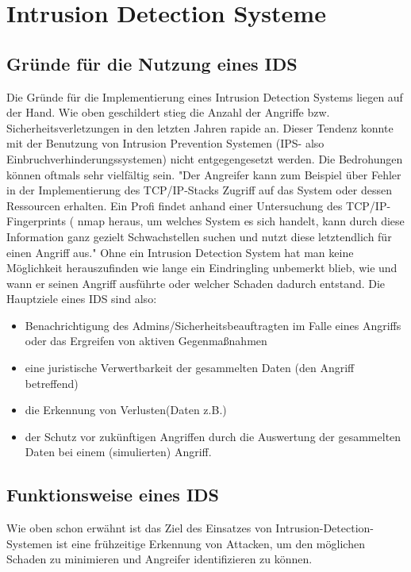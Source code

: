 \documentclass[11pt]{scrartcl}
\begin{document}
\section{Intrusion Detection Systeme}
\label{sec:IDS}

\subsection{Gründe für die Nutzung eines IDS}
\label{sec:reasons IDS}
Die Gründe für die Implementierung eines Intrusion Detection Systems liegen auf der Hand. Wie oben geschildert stieg die Anzahl der Angriffe bzw. Sicherheitsverletzungen in den letzten Jahren rapide an. Dieser Tendenz konnte mit der Benutzung von Intrusion Prevention Systemen (IPS- also Einbruchverhinderungssystemen) nicht entgegengesetzt werden. 
Die Bedrohungen können oftmals sehr vielfältig sein. "Der Angreifer kann zum Beispiel über Fehler in der Implementierung des  TCP/IP-Stacks Zugriff auf das System oder dessen Ressourcen erhalten. Ein Profi findet anhand einer Untersuchung des TCP/IP-Fingerprints ( nmap heraus, um welches System es sich handelt, kann durch diese Information ganz gezielt Schwachstellen suchen und nutzt diese letztendlich für einen Angriff aus."
Ohne ein Intrusion Detection System hat man keine Möglichkeit herauszufinden wie lange ein Eindringling unbemerkt blieb, wie und wann er seinen Angriff ausführte oder welcher Schaden dadurch entstand.
Die Hauptziele eines IDS sind also:\\
\begin{itemize}
\item Benachrichtigung des Admins/Sicherheitsbeauftragten im Falle eines Angriffs oder das Ergreifen von aktiven Gegenmaßnahmen
\item eine juristische Verwertbarkeit der gesammelten Daten (den Angriff betreffend)
\item die Erkennung von Verlusten(Daten z.B.)
\item der Schutz vor zukünftigen Angriffen durch die Auswertung der gesammelten Daten bei einem (simulierten) Angriff. \cite{6}
\end{itemize}

\subsection{Funktionsweise eines IDS}
\label{sec:function IDS}
Wie oben schon erwähnt ist das Ziel des Einsatzes von Intrusion-Detection-Systemen ist eine  frühzeitige Erkennung von Attacken, um den möglichen Schaden zu minimieren und
Angreifer identifizieren zu können. 
\end{document}
